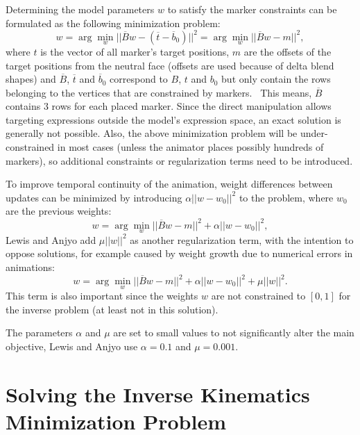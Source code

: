 Determining the model parameters \(w\) to satisfy the marker constraints can be formulated as the following minimization problem:
\[w=\arg\min\limits_w||\overline{B}w-(\overline{t}-\overline{b}_0)||^2=\arg\min\limits_w||\overline{B}w-m||^2,\]
where \(t\) is the vector of all marker's target positions,
\(m\) are the offsets of the target positions from the neutral face (offsets are used because of delta blend shapes) and \(\overline{B}\),
\(\overline{t}\) and \(\overline{b}_0\) correspond to \(B\),
\(t\) and \(b_0\) but only contain the rows belonging to the vertices that are constrained by markers.~\autocite{directmanipulationblendshapes}
This means, \(\overline{B}\) contains \(3\) rows for each placed marker.
Since the direct manipulation allows targeting expressions outside the model's expression space,
an exact solution is generally not possible.
Also, the above minimization problem will be under-constrained in most cases (unless the animator places possibly hundreds of markers),
so additional constraints or regularization terms need to be introduced.

To improve temporal continuity of the animation, weight differences between updates can be minimized by introducing \(\alpha||w-w_0||^2\) to the problem,
where \(w_0\) are the previous weights:~\autocite{directmanipulationblendshapes}
\[w=\arg\min\limits_w||\overline{B}w-m||^2+\alpha||w-w_0||^2,\]
Lewis and Anjyo add \(\mu||w||^2\) as another regularization term,
with the intention to oppose  solutions,
for example caused by weight growth due to numerical errors in  animations:~\autocite{directmanipulationblendshapes}
\[w=\arg\min\limits_w||\overline{B}w-m||^2+\alpha||w-w_0||^2+\mu||w||^2.\]
This term is also important since the weights \(w\) are not constrained to \([0, 1]\) for the inverse problem (at least not in this solution).

The parameters \(\alpha\) and \(\mu\) are set to small values to not significantly alter the main objective,
Lewis and Anjyo use \(\alpha=0.1\) and \(\mu=0.001\).~\autocite{directmanipulationblendshapes}

\section{Solving the Inverse Kinematics Minimization Problem}
\label{sec:solvingblendshapeinversekinematics}


